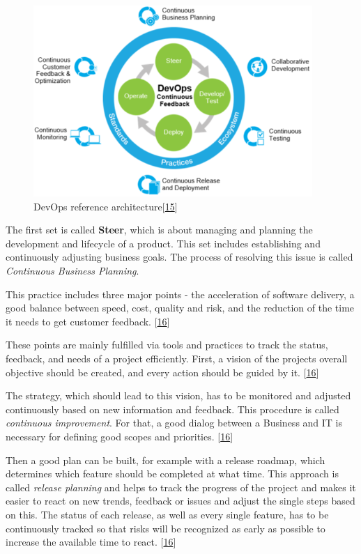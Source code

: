 \documentclass[12pt,english,a4paper,oneside,,tablecaptionabove]{scrbook}
\begin{document}
\begin{figure}
\hypertarget{fig:devops_architecture}{%
\centering
\includegraphics[width=4.16667in,height=\textheight]{images/chapter2/devops_architecture.png}
\caption{DevOps reference
architecture{[}\protect\hyperlink{ref-Sharma2017}{15}{]}}\label{fig:devops_architecture}
}
\end{figure}

The first set is called \textbf{Steer}, which is about managing and
planning the development and lifecycle of a product. This set includes
establishing and continuously adjusting business goals. The process of
resolving this issue is called \emph{Continuous Business Planning}.

This practice includes three major points - the acceleration of software
delivery, a good balance between speed, cost, quality and risk, and the
reduction of the time it needs to get customer feedback.
{[}\protect\hyperlink{ref-IBM2013}{16}{]}

These points are mainly fulfilled via tools and practices to track the
status, feedback, and needs of a project efficiently. First, a vision of
the projects overall objective should be created, and every action
should be guided by it. {[}\protect\hyperlink{ref-IBM2013}{16}{]}

The strategy, which should lead to this vision, has to be monitored and
adjusted continuously based on new information and feedback. This
procedure is called \emph{continuous improvement}. For that, a good
dialog between a Business and IT is necessary for defining good scopes
and priorities. {[}\protect\hyperlink{ref-IBM2013}{16}{]}

Then a good plan can be built, for example with a release roadmap, which
determines which feature should be completed at what time. This approach
is called \emph{release planning} and helps to track the progress of the
project and makes it easier to react on new trends, feedback or issues
and adjust the single steps based on this. The status of each release,
as well as every single feature, has to be continuously tracked so that
risks will be recognized as early as possible to increase the available
time to react. {[}\protect\hyperlink{ref-IBM2013}{16}{]}
\end{document}
